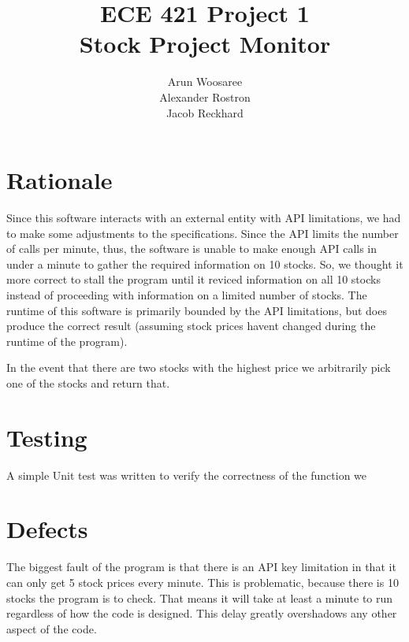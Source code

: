 \documentclass[letterpaper]{article}
\title{ECE 421 Project 1\\
Stock Project Monitor}
\author{Arun Woosaree\\
Alexander Rostron\\
Jacob Reckhard
}
\begin{document}
\maketitle %

\section{Rationale}
Since this software interacts with an external entity with API limitations, we
had to make some adjustments to the specifications. Since the API limits the
number of calls per minute, thus, the software is unable to make enough API
calls in under a minute to gather the required information on 10 stocks. So,
we thought it more correct to stall the program until it reviced information
on all 10 stocks instead of proceeding with information on a limited number of
stocks. The runtime of this software is primarily bounded by the API
limitations, but does produce the correct result (assuming stock prices
havent changed during the runtime of the program).

In the event that there are two stocks with the highest price we arbitrarily
pick one of the stocks and return that.

\section{Testing}
A simple Unit test was written to verify the correctness of the function we

\section{Defects}

The biggest fault of the program is that there is an API key limitation in that
it can only get 5 stock prices every minute. This is problematic, because there
is 10 stocks the program is to check. That means it will take at least a minute
to run regardless of how the code is designed. This delay greatly overshadows
any other aspect of the code.
\end{document}
